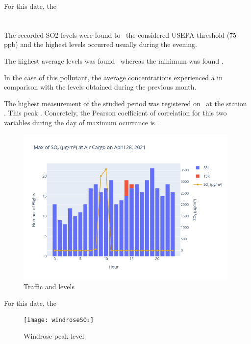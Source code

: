 \documentclass[12pt, oneside]{book}
\begin{document}
For this date, the \windOthree


\section{}

The recorded SO2 levels were found to \tresholdSOtwo\ the considered USEPA threshold (75 ppb) and the highest levels occurred usually during the evening.

The highest average  levels was found \maxDailySOtwo\ whereas the minimum was found \minDailySOtwo .

In the case of this pollutant, the average concentrations experienced a \monthChangeSOtwo in comparison with the levels obtained during the previous month.

The highest measurement of the studied period was registered  on \dayMaxSOtwo \ at the station \stationMaxSOtwo . This peak \relTrafficMaxSOtwo . Concretely, the Pearson coefficient of correlation for this two variables during the day of maximum ocurrance is \correlSOtwo .  

{\begin{figure}[H]
\centering
\includegraphics[width=0.98\textwidth,keepaspectratio]{image13}
\caption{Traffic and  levels}\label{image13}
\end{figure}}{}

For this date, the \windSOtwo

{\begin{figure}[H]
\centering
	\texttt{[image: windroseSO₂]}
\caption{Windrose  peak level}\label{windroseSO2}
\end{figure}}{}
\end{document}
